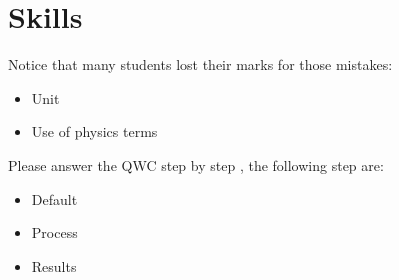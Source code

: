 \documentclass[a4paper]{article}
\begin{document}
\section{Skills}
\begin{prop}[Notices]
Notice that many students lost their marks for those mistakes:
\begin{itemize}
\item Unit
\item Use of physics terms
\end{itemize}

\end{prop}

\begin{prop}[QWC]
Please answer the QWC step by step , the following step are:
\begin{itemize}
\item Default
\item Process
\item Results
\end{itemize}
\end{prop}
\end{document}
